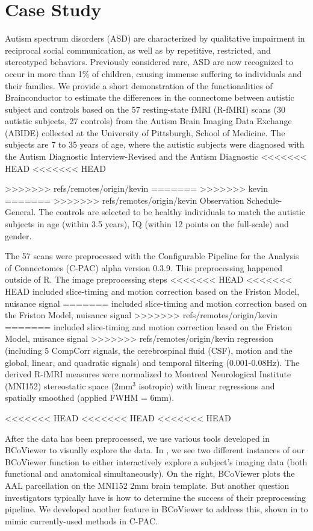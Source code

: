 \documentclass{nature}
\begin{document}
{\section{Case Study}

Autism spectrum disorders (ASD) are characterized by qualitative impairment in
reciprocal social communication, as well as by repetitive, restricted, and
stereotyped behaviors. Previously considered rare, ASD are now recognized to
occur in more than 1\% of children, causing immense suffering to individuals and
their families. 
We provide a short demonstration of the functionalities of Brainconductor to
estimate the differences in the connectome between autistic subject and controls
based
on the 57 resting-state fMRI (R-fMRI) scans (30 autistic subjects, 27 controls)
from the Autism
Brain Imaging Data Exchange (ABIDE) collected at the 
University of Pittsburgh, School of Medicine\cite{di2014autism}. 
The subjects are 7 to 35 years of age, where the autistic subjects were
diagnosed with the Autism Diagnostic Interview-Revised and the Autism Diagnostic
<<<<<<< HEAD
<<<<<<< HEAD

>>>>>>> refs/remotes/origin/kevin
=======
>>>>>>> kevin
=======
>>>>>>> refs/remotes/origin/kevin
Observation Schedule-General. The controls are selected to be healthy
individuals to match the autistic subjects in age (within 3.5 years), IQ (within
12 points on the full-scale) and gender.

The 57 scans were preprocessed with the Configurable Pipeline for the Analysis
of Connectomes (C-PAC) alpha version 0.3.9. This preprocessing 
happened outside of R. The image preprocessing steps
<<<<<<< HEAD
<<<<<<< HEAD
included slice-timing and motion correction based on the Friston Model, nuisance signal
=======
included slice-timing and motion correction based on the Friston Model, nuisance
signal
>>>>>>> refs/remotes/origin/kevin
=======
included slice-timing and motion correction based on the Friston Model, nuisance
signal
>>>>>>> refs/remotes/origin/kevin
regression (including 5 CompCorr signals, the cerebrospinal fluid (CSF), motion
 and the global, linear, and quadratic
signals) and temporal filtering (0.001-0.08Hz). The derived R-fMRI measures
were normalized to Montreal Neurological Institute (MNI152) stereostatic
space (2mm$^3$ isotropic) with linear regressions and spatially smoothed
(applied FWHM = 6mm). 

<<<<<<< HEAD
<<<<<<< HEAD
<<<<<<< HEAD

After the data has been preprocessed, we use various tools developed in BCoViewer
to visually explore the data. In , we see two different instances
of our BCoViewer function to either interactively explore a subject's imaging data (both
functional and anatomical simultaneously). On the right, BCoViewer plots the AAL parcellation
on the MNI152 2mm brain template. But another question investigators typically have is 
how to determine the success of their preprocessing pipeline. We developed another feature
in BCoViewer to address this, shown in  to mimic currently-used methods
in C-PAC.


}
\end{document}
